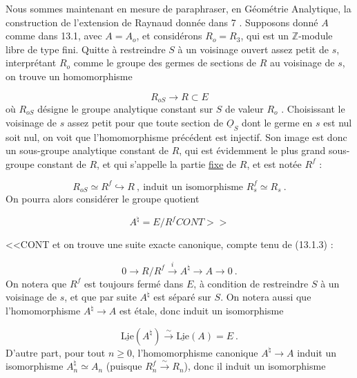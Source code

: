 Nous sommes maintenant en mesure de paraphraser, en Géométrie Analytique, la construction de l'extension de Raynaud donnée dans 7 . Supposons donné $A$ comme dans 13.1, avec $A = A_o$, et considérons $R_o = R_3$, qui est un $\mathbb{Z}$-module libre de type fini. Quitte à restreindre $S$ à un voisinage ouvert assez petit de $s$, interprétant $R_o$ comme le groupe des germes de sections de $R$ au voisinage de $s$, on trouve un homomorphisme

\begin{equation}\tag{13.3.1}
R_{oS} \longrightarrow R \subset E
\end{equation}
où $R_{oS}$ désigne le groupe analytique constant sur $S$ de valeur $R_o$ . Choisissant le voisinage de $s$ assez petit pour que toute section de $\underline{O}_S$ dont le germe en $s$ est nul soit nul, on voit que l'homomorphisme précédent est injectif. Son image est donc un sous-groupe analytique constant de $R$, qui est évidemment le plus grand sous-groupe constant de $R$, et qui s'appelle la partie \underline{fixe} de $R$, et est notée $R^f$ :

\begin{equation}\tag{13.3.2}
R_{oS} \simeq R^f \hookrightarrow R \ , \ \mbox{induit un isomorphisme } R^f_s \simeq R_s \ .
\end{equation}
On pourra alors considérer le groupe quotient

\begin{equation}\tag{13.3.3}
A^\natural = E/R^f CONT>>
\end{equation}


<<CONT et on trouve une suite exacte canonique, compte tenu de (13.1.3) :

\begin{equation}\tag{13.3.4}
0 \longrightarrow R/R^f \stackrel{i}{\longrightarrow} A^\natural \longrightarrow A \longrightarrow 0 \ .
\end{equation}
On notera que $R^f$ est toujours fermé dans $E$, à condition de restreindre $S$ à un voisinage de $s$, et que par suite $A^\natural$ est séparé sur $S$. On notera aussi que l'homomorphisme $A^\natural \longrightarrow A$ est étale, donc induit un isomorphisme

\begin{equation}\tag{13.3.5}
\underline{\mathrm{Lie}}(A^\natural) \stackrel{\sim}{\longrightarrow} \underline{\mathrm{Lie}}(A) = E \ .
\end{equation}
D'autre part, pour tout $n \geqslant 0$, l'homomorphisme canonique $A^\natural \longrightarrow A$ induit un isomorphisme $A^\natural_n \simeq A_n$ (puisque $R^f_n \stackrel{\sim}{\longrightarrow} R_n$), donc il induit un isomorphisme

